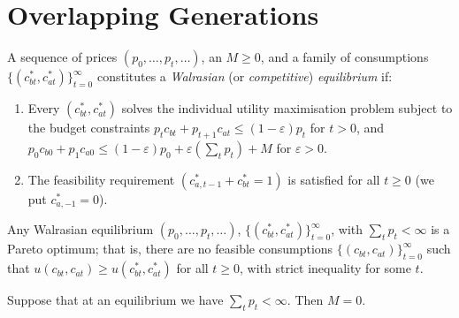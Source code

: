 \section{Overlapping Generations}

\begin{defn}
    A sequence of prices $(p_0, \dots, p_t, \dots)$, an $M \geq 0$, and a family of consumptions $\{(c^*_{bt}, c^*_{at})\}_{t = 0}^\infty$ constitutes a \emph{Walrasian} (or \emph{competitive}) \emph{equilibrium} if:
    \begin{enumerate}
        \item 
        Every $(c^*_{bt}, c^*_{at})$ solves the individual utility maximisation problem subject to the budget constraints $p_t c_{bt} + p_{t + 1} c_{at} \leq (1 - \varepsilon) p_t$ for $t > 0$, and $p_0 c_{b0} + p_1 c_{a0} \leq (1 - \varepsilon)p_0 + \varepsilon \left(\sum_t p_t\right) + M$ for $\varepsilon > 0$.
        
        \item 
        The feasibility requirement $(c^*_{a, t - 1} + c^*_{bt} = 1)$ is satisfied for all $t \geq 0$ (we put $c^*_{a, -1} = 0$).
    \end{enumerate}
\end{defn}

\begin{prop}
    Any Walrasian equilibrium $(p_0, \dots, p_t, \dots)$, $\{(c^*_{bt}, c^*_{at})\}_{t = 0}^\infty$, with $\sum_t p_t < \infty$ is a Pareto optimum; that is, there are no feasible consumptions $\{(c_{bt}, c_{at})\}_{t = 0}^\infty$ such that $u(c_{bt}, c_{at}) \geq u(c^*_{bt}, c^*_{at})$ for all $t \geq 0$, with strict inequality for some $t$.
\end{prop}

\begin{prop}
    Suppose that at an equilibrium we have $\sum_t p_t < \infty$. Then $M = 0$.
\end{prop}
